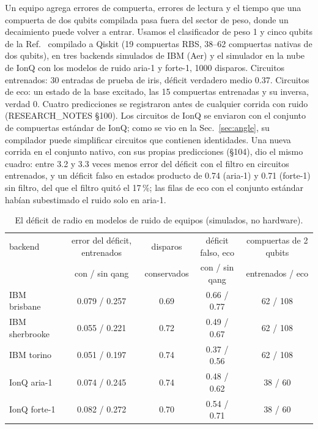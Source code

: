 \documentclass[11pt]{article}
\begin{document}
Un equipo agrega errores de compuerta, errores de lectura y el tiempo que una compuerta de dos qubits compilada pasa
fuera del sector de peso, donde un decaimiento puede volver a entrar. Usamos el clasificador de peso 1 y cinco qubits de
la Ref.~\cite{monteverde2026qml} compilado a Qiskit (19 compuertas RBS, 38--62 compuertas nativas de dos qubits), en tres
backends simulados de IBM (Aer) y el simulador en la nube de IonQ con los modelos de ruido aria-1 y forte-1, 1000
disparos. Circuitos entrenados: 30 entradas de prueba de iris, déficit verdadero medio 0.37. Circuitos de eco: un estado
de la base excitado, las 15 compuertas entrenadas y su inversa, verdad 0. Cuatro predicciones se registraron antes de
cualquier corrida con ruido (RESEARCH\_NOTES \S100). Los circuitos de IonQ se enviaron con el conjunto de compuertas
estándar de IonQ; como se vio en la Sec.~\ref{sec:angle}, su compilador puede simplificar circuitos que contienen
identidades. Una nueva corrida en el conjunto nativo, con sus propias predicciones (\S104), dio el mismo cuadro: entre
3.2 y 3.3 veces menos error del déficit con el filtro en circuitos entrenados, y un déficit falso en estados producto de
0.74 (aria-1) y 0.71 (forte-1) sin filtro, del que el filtro quitó el 17\,\%; las filas de eco con el conjunto estándar
habían subestimado el ruido solo en aria-1.

\begin{table}[h]
\centering\small
\begin{tabular}{lcccc}
\toprule
backend & error del déficit, entrenados & disparos & déficit falso, eco & compuertas de 2 qubits \\
 & con / sin qang & conservados & con / sin qang & entrenados / eco \\
\midrule
IBM brisbane & 0.079 / 0.257 & 0.69 & 0.66 / 0.77 & 62 / 108 \\
IBM sherbrooke & 0.055 / 0.221 & 0.72 & 0.49 / 0.67 & 62 / 108 \\
IBM torino & 0.051 / 0.197 & 0.74 & 0.37 / 0.56 & 62 / 108 \\
IonQ aria-1 & 0.074 / 0.245 & 0.74 & 0.48 / 0.62 & 38 / 60 \\
IonQ forte-1 & 0.082 / 0.272 & 0.70 & 0.54 / 0.71 & 38 / 60 \\
\bottomrule
\end{tabular}
\caption{El déficit de radio en modelos de ruido de equipos (simulados, no hardware).}
\label{tab:dev}
\end{table}
\end{document}
